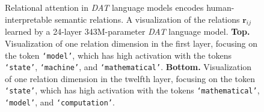 \begin{figure}[t]
\begin{subfigure}[t]{\textwidth}
    \end{subfigure}
    \caption{Relational attention in \textit{DAT} language models encodes human-interpretable semantic relations. A visualization of the relations $\boldsymbol{r}_{ij}$ learned by a 24-layer 343M-parameter \textit{DAT} language model. \textbf{Top.} Visualization of one relation dimension in the first layer, focusing on the token \texttt{`model'}, which has high activation with the tokens \texttt{`state'}, \texttt{`machine'}, and \texttt{`mathematical'}. \textbf{Bottom.} Visualization of one relation dimension in the twelfth layer, focusing on the token \texttt{`state'}, which has high activation with the tokens \texttt{`mathematical'}, \texttt{`model'}, and \texttt{`computation'}.}\label{fig:datlm_viz}
\end{figure}

